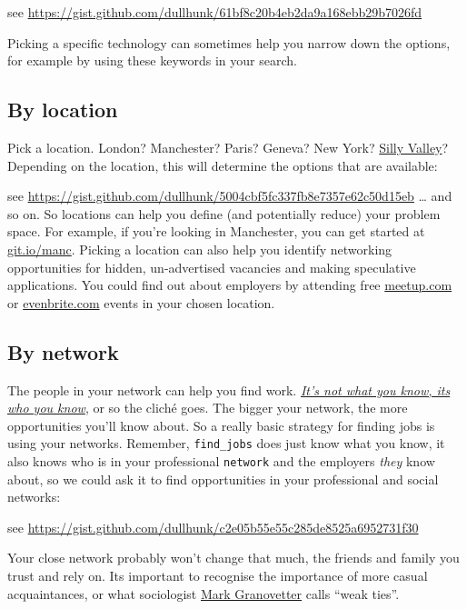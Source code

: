 \documentclass[
]{book}
\begin{document}
see \url{https://gist.github.com/dullhunk/61bf8c20b4eb2da9a168ebb29b7026fd}

Picking a specific technology can sometimes help you narrow down the options, for example by using these keywords in your search.

\hypertarget{by-location}{%
\subsection{By location}\label{by-location}}

Pick a location. London? Manchester? Paris? Geneva? New York? \href{https://en.wikipedia.org/wiki/Silicon_Valley}{Silly Valley}? Depending on the location, this will determine the options that are available:

see \url{https://gist.github.com/dullhunk/5004cbf5fc337fb8e7357e62c50d15eb}
\ldots{} and so on. So locations can help you define (and potentially reduce) your problem space. For example, if you're looking in Manchester, you can get started at \href{https://git.io/manc}{git.io/manc}. Picking a location can also help you identify networking opportunities for hidden, un-advertised vacancies and making speculative applications. You could find out about employers by attending free \href{https://www.meetup.com/}{meetup.com} or \href{https://www.eventbrite.com/}{evenbrite.com} events in your chosen location.

\hypertarget{weakties}{%
\subsection{By network}\label{weakties}}

The people in your network can help you find work. \emph{\href{https://en.wiktionary.org/wiki/it\%27s_not_what_you_know_but_who_you_know}{It's not what you know, its who you know}}, or so the cliché goes. The bigger your network, the more opportunities you'll know about. So a really basic strategy for finding jobs is using your networks. Remember, \texttt{find\_jobs} does just know what you know, it also knows who is in your professional \texttt{network} and the employers \emph{they} know about, so we could ask it to find opportunities in your professional and social networks:

see \url{https://gist.github.com/dullhunk/c2e05b55e55c285de8525a6952731f30}

Your close network probably won't change that much, the friends and family you trust and rely on. Its important to recognise the importance of more casual acquaintances, or what sociologist \href{https://en.wikipedia.org/wiki/Mark_Granovetter}{Mark Granovetter} calls ``weak ties''. \citep{granovetter}
\end{document}
